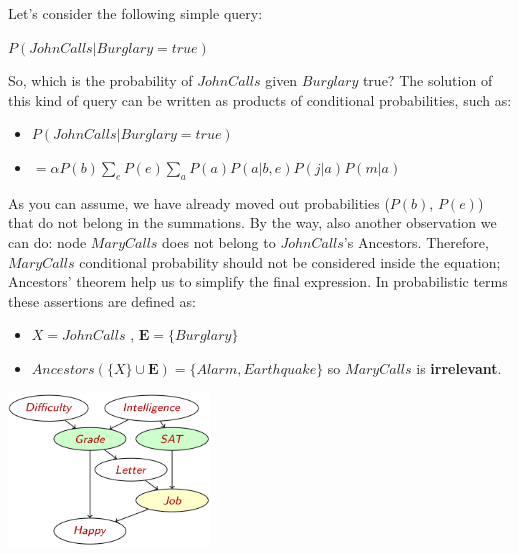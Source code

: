 \begin{example}
    Let's consider the following simple query: \vspace{3.5pt}
    \begin{center}
        $P(JohnCalls|Burglary = true)$
    \end{center} \vspace{3.5pt}
    So, which is the probability of $JohnCalls$ given $Burglary$ true? The solution of this kind of query can be written as products of conditional probabilities, such as: \vspace{7pt}
    \begin{itemize}
        \renewcommand{\labelitemi}{}
        \item $P(JohnCalls|Burglary = true)$
        \item $= \alpha P(b) \sum_{e}P(e) \sum_{a}P(a) P(a|b,e) P(j|a) P(m|a)$
    \end{itemize} \vspace{3.5pt}
    As you can assume, we have already moved out probabilities ($P(b)$, $P(e)$) that do not belong in the summations. By the way, also another observation we can do: node $MaryCalls$
    does not belong to $JohnCalls$'s Ancestors. Therefore, $MaryCalls$ conditional probability should not be considered inside the equation; Ancestors' theorem help us to simplify the
    final expression. In probabilistic terms these assertions are defined as: \vspace{3.5pt}
    \begin{itemize}
        \renewcommand{\labelitemi}{}
        \item $X = JohnCalls$ , $\mathbf{E}=\{Burglary\}$
        \item $Ancestors(\{X\} \cup \mathbf{E}) = \{Alarm, Earthquake\}$ so $MaryCalls$ is \textbf{irrelevant}.
    \end{itemize} \vspace{3.5pt}
    \begin{center}
        \includegraphics[width=0.4\textwidth]{img/img15.png}
    \end{center} \vspace{3.5pt}


\end{example}
